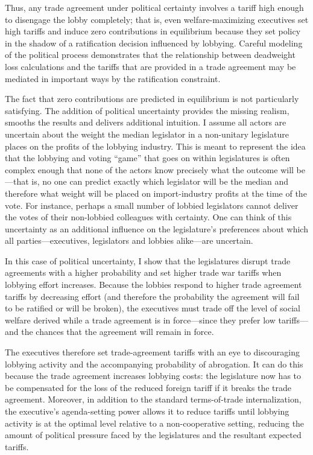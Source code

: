 \documentclass[10pt]{article}
\begin{document}
Thus, any trade agreement under political certainty involves a tariff high enough to disengage the lobby completely; that is, even welfare-maximizing executives set high tariffs and induce zero contributions in equilibrium because they set policy in the shadow of a ratification decision influenced by lobbying. Careful modeling of the political process demonstrates that the relationship between deadweight loss calculations and the tariffs that are provided in a trade agreement may be mediated in important ways by the ratification constraint.

The fact that zero contributions are predicted in equilibrium is not particularly satisfying. The addition of political uncertainty provides the missing realism, smooths the results and delivers additional intuition. I assume all actors are uncertain about the weight the median legislator in a non-unitary legislature places on the profits of the lobbying industry. This is meant to represent the idea that the lobbying and voting ``game'' that goes on within legislatures is often complex enough that none of the actors know precisely what the outcome will be---that is, no one can predict exactly which legislator will be the median and therefore what weight will be placed on import-industry profits at the time of the vote. For instance, perhaps a small number of lobbied legislators cannot deliver the votes of their non-lobbied colleagues with certainty. One can think of this uncertainty as an additional influence on the legislature's preferences about which all parties---executives, legislators and lobbies alike---are uncertain.

In this case of political uncertainty, I show that the legislatures disrupt trade agreements with a higher probability and set higher trade war tariffs when lobbying effort increases. Because the lobbies respond to higher trade agreement tariffs by decreasing effort (and therefore the probability the agreement will fail to be ratified or will be broken), the executives must trade off the level of social welfare derived while a trade agreement is in force---since they prefer low tariffs---and the chances that the agreement will remain in force.

The executives therefore set trade-agreement tariffs with an eye to discouraging lobbying activity and the accompanying probability of abrogation. It can do this because the trade agreement increases lobbying costs: the legislature now has to be compensated for the loss of the reduced foreign tariff if it breaks the trade agreement. Moreover, in addition to the standard terms-of-trade internalization, the executive's agenda-setting power allows it to reduce tariffs until lobbying activity is at the optimal level relative to a non-cooperative setting, reducing the amount of political pressure faced by the legislatures and the resultant expected tariffs.
\end{document}

